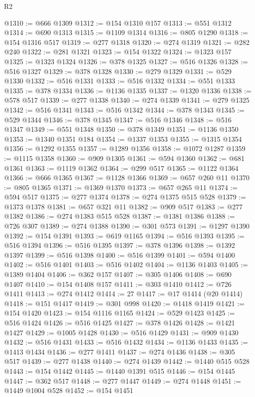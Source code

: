 \begin{lexlean}{R2}
\begin{coremodule}
@1310 := @666 @1309
@1312 := @154 @1310 @157
@1313 := @551 @1312
@1314 := @690 @1313
@1315 := @1109 @1314
@1316 := @805 @1290
@1318 := @154 @1316 @517
@1319 := @277 @1318
@1320 := @274 @1319
@1321 := @282 @240
@1322 := @281 @1321
@1323 := @154 @1322
@1324 := @1323 @157
@1325 := @1323 @1324
@1326 := @378 @1325
@1327 := @516 @1326
@1328 := @516 @1327
@1329 := @378 @1328
@1330 := @279 @1329
@1331 := @529 @1330
@1332 := @516 @1331
@1333 := @516 @1332
@1334 := @551 @1333
@1335 := @378 @1334
@1336 := @1136 @1335
@1337 := @1320 @1336
@1338 := @578 @517
@1339 := @277 @1338
@1340 := @274 @1339
@1341 := @279 @1325
@1342 := @516 @1341
@1343 := @516 @1342
@1344 := @378 @1343
@1345 := @529 @1344
@1346 := @378 @1345
@1347 := @516 @1346
@1348 := @516 @1347
@1349 := @551 @1348
@1350 := @378 @1349
@1351 := @1136 @1350
@1353 := @1340 @1351 @184
@1354 := @1337 @1353
@1355 := @1315 @1354
@1356 := @1292 @1355
@1357 := @1289 @1356
@1358 := @1072 @1287
@1359 := @1115 @1358
@1360 := @909 @1305
@1361 := @594 @1360
@1362 := @681 @1361
@1363 := @1119 @1362
@1364 := @299 @517
@1365 := @1122 @1364
@1366 := @666 @1365
@1367 := @1128 @1366
@1369 := @657 @260 @11
@1370 := @805 @1365
@1371 := @1369 @1370
@1373 := @657 @265 @11
@1374 := @594 @517
@1375 := @277 @1374
@1378 := @274 @1375 @515 @528
@1379 := @1373 @1378
@1381 := @657 @321 @11
@1382 := @909 @517
@1383 := @277 @1382
@1386 := @274 @1383 @515 @528
@1387 := @1381 @1386
@1388 := @726 @307
@1389 := @274 @1388
@1390 := @301 @573
@1391 := @1297 @1390
@1392 := @154 @1391
@1393 := @619 @1165
@1394 := @516 @1393
@1395 := @516 @1394
@1396 := @516 @1395
@1397 := @378 @1396
@1398 := @1392 @1397
@1399 := @516 @1398
@1400 := @516 @1399
@1401 := @594 @1400
@1402 := @516 @1401
@1403 := @516 @1402
@1404 := @1136 @1403
@1405 := @1389 @1404
@1406 := @362 @157
@1407 := @305 @1406
@1408 := @690 @1407
@1410 := @154 @1408 @157
@1411 := @303 @1410
@1412 := @726 @1411
@1413 := @274 @1412
@1414 := 27
@1417 := @17 @1414 (@20 @1414)
@1418 := @151 @1417
@1419 := @301 @998
@1420 := @1418 @1419
@1421 := @154 @1420
@1423 := @154 @1116 @1165
@1424 := @529 @1423
@1425 := @516 @1424
@1426 := @516 @1425
@1427 := @378 @1426
@1428 := @1421 @1427
@1429 := @1005 @1428
@1430 := @516 @1429
@1431 := @909 @1430
@1432 := @516 @1431
@1433 := @516 @1432
@1434 := @1136 @1433
@1435 := @1413 @1434
@1436 := @277 @1411
@1437 := @274 @1436
@1438 := @305 @517
@1439 := @277 @1438
@1440 := @274 @1439
@1442 := @1440 @515 @528
@1443 := @154 @1442
@1445 := @1440 @1391 @515
@1446 := @154 @1445
@1447 := @362 @517
@1448 := @277 @1447
@1449 := @274 @1448
@1451 := @1449 @1004 @528
@1452 := @154 @1451

\end{coremodule}
\end{lexlean}
